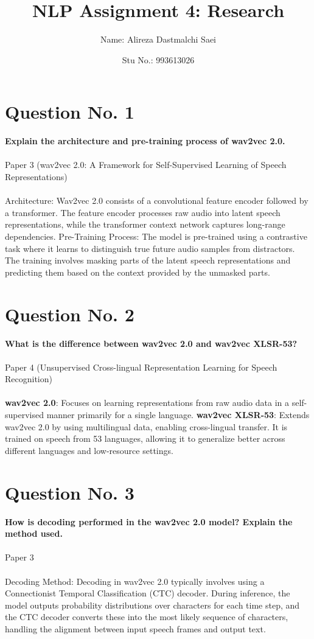 \documentclass{article}
\title{\textbf{\Huge NLP Assignment 4: Research}}
\author{Name: Alireza Dastmalchi Saei}
\date{Stu No.: 993613026}
\begin{document}
\maketitle

\pagebreak


\section*{Question No. 1}
\textbf{Explain the architecture and pre-training process of wav2vec 2.0.}\\\\
Paper 3 (wav2vec 2.0: A Framework for Self-Supervised Learning of Speech Representations)\\\\
Architecture: Wav2vec 2.0 consists of a convolutional feature encoder followed by a transformer. The feature encoder processes raw audio into latent speech representations, while the transformer context network captures long-range dependencies.
Pre-Training Process: The model is pre-trained using a contrastive task where it learns to distinguish true future audio samples from distractors. The training involves masking parts of the latent speech representations and predicting them based on the context provided by the unmasked parts.

\pagebreak

\section*{Question No. 2}
\textbf{What is the difference between wav2vec 2.0 and wav2vec XLSR-53?}\\\\
Paper 4 (Unsupervised Cross-lingual Representation Learning for Speech Recognition)\\\\
\textbf{wav2vec 2.0}: Focuses on learning representations from raw audio data in a self-supervised manner primarily for a single language.
\textbf{wav2vec XLSR-53}: Extends wav2vec 2.0 by using multilingual data, enabling cross-lingual transfer. It is trained on speech from 53 languages, allowing it to generalize better across different languages and low-resource settings.

\pagebreak

\section*{Question No. 3}
\textbf{How is decoding performed in the wav2vec 2.0 model? Explain the method used.}\\\\
Paper 3\\\\
Decoding Method: Decoding in wav2vec 2.0 typically involves using a Connectionist Temporal Classification (CTC) decoder. During inference, the model outputs probability distributions over characters for each time step, and the CTC decoder converts these into the most likely sequence of characters, handling the alignment between input speech frames and output text.
\end{document}
